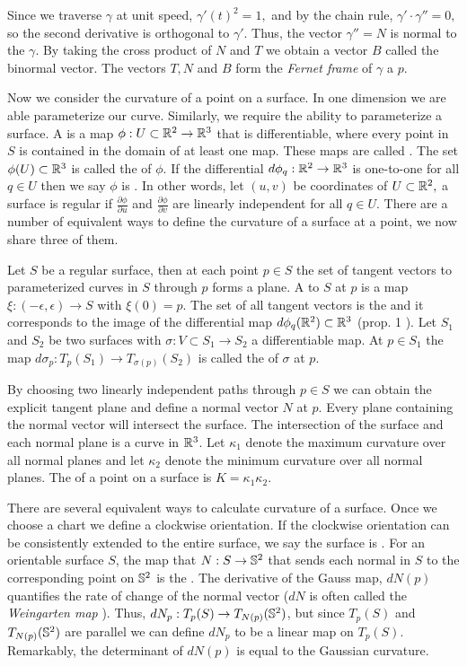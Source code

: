 Since we traverse $\gamma$
at unit speed, $\gamma'(t)^2=1,$ and by the chain rule, $\gamma'\cdot \gamma''=0,$
so  the second derivative is orthogonal to $\gamma'$. Thus, the
vector $\gamma''=N$ is normal to the $\gamma$. 
By taking the cross product of $N$ and $T$ we obtain a vector $B$ called
the binormal vector.
The vectors $T,N$ and $B$ form the \emph{Fernet frame} of $\gamma$ a $p.$

Now we consider the curvature of a point on a surface. In one dimension we are
able parameterize our curve. Similarly, we require the ability to parameterize a surface.
A  is a map $\phi:U\subset \mathbb{R}^2 \to \mathbb{R}^3$ that
is differentiable, where every point in $S$ is contained in the domain of at least one map.
These maps are called .
 The set $\phi(U)\subset \mathbb{R}^3$ is called the  of $\phi$.
If the differential $d\phi_q:\mathbb{R}^2\to \mathbb{R}^3$ is one-to-one for all $q\in U$ then
we say $\phi$ is . In other words, let $(u,v)$ be coordinates of $U\subset \mathbb{R}^2,$
a surface is regular if $\frac{\partial\phi}{\partial u}$
and $\frac{\partial\phi}{\partial v}$ are linearly independent for all $q\in U$.
There are a number of equivalent ways to define the curvature of a surface at a point,
we now share three of them.

Let $S$ be a regular surface, then at each point $p\in S$ the set of tangent vectors
to parameterized curves in $S$ through $p$ forms a plane.
A  to $S$ at $p$ is a map $\xi:(-\epsilon,\epsilon)\to S$ with $\xi(0)=p$.
The set of all tangent vectors is the  and it corresponds to the image
of the differential map $d\phi_q(\mathbb{R}^2)\subset \mathbb{R}^3$ (prop. 1 \cite{doc76}).
Let $S_1$ and $S_2$ be two surfaces with $\sigma:V\subset S_1\to S_2$ a differentiable map.
At $p\in S_1$ the map $d\sigma_p:T_p(S_1)\to T_{\sigma(p)}(S_2)$ is called the
 of $\sigma$ at $p$.

By choosing two linearly independent paths through $p\in S$ we can obtain the explicit tangent
plane and define a normal vector $N$ at $p$.
Every plane containing the normal vector will intersect the surface.
The intersection of the surface and each normal plane is a curve in $\mathbb{R}^3$. 
Let $\kappa_1$ denote the maximum curvature over all normal planes
and let $\kappa_2$ denote the minimum curvature over all normal planes.
The  of a point on a surface is
$K=\kappa_1\kappa_2.$

There are several equivalent ways to calculate curvature of a surface.
Once we choose a chart we define a clockwise orientation. If the clockwise
orientation can be consistently extended to the entire surface, we say
the surface is .
For an orientable surface $S$, the map that  $N:S\to \mathbb{S}^2$ that sends each
normal in $S$ to the corresponding point on $\mathbb{S}^2$ is
the .
The derivative of the Gauss map, $dN(p)$ quantifies the rate of change of
the normal vector ($dN$ is often called the \emph{Weingarten map} \cite{Crane:2013}).
Thus, $dN_p:T_p(S)\to T_{N(p)}(\mathbb{S}^2)$, but since $T_p(S)$ and $T_{N(p)}(\mathbb{S}^2)$
are parallel we can define $dN_p$ to be a linear map on $T_p(S)$.
Remarkably, the determinant of $dN(p)$ is equal to the Gaussian curvature.

